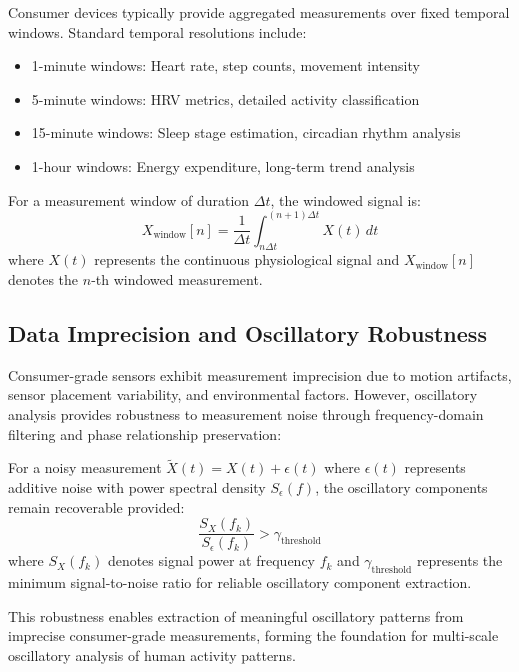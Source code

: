 Consumer devices typically provide aggregated measurements over fixed temporal windows. Standard temporal resolutions include:

\begin{itemize}
\item 1-minute windows: Heart rate, step counts, movement intensity
\item 5-minute windows: HRV metrics, detailed activity classification
\item 15-minute windows: Sleep stage estimation, circadian rhythm analysis
\item 1-hour windows: Energy expenditure, long-term trend analysis
\end{itemize}

\begin{definition}
For a measurement window of duration $\Delta t$, the windowed signal is:
\begin{equation}
X_{\text{window}}[n] = \frac{1}{\Delta t} \int_{n\Delta t}^{(n+1)\Delta t} X(t) \, dt
\end{equation}
where $X(t)$ represents the continuous physiological signal and $X_{\text{window}}[n]$ denotes the $n$-th windowed measurement.
\end{definition}

\subsection{Data Imprecision and Oscillatory Robustness}

Consumer-grade sensors exhibit measurement imprecision due to motion artifacts, sensor placement variability, and environmental factors. However, oscillatory analysis provides robustness to measurement noise through frequency-domain filtering and phase relationship preservation:

\begin{theorem}
For a noisy measurement $\tilde{X}(t) = X(t) + \epsilon(t)$ where $\epsilon(t)$ represents additive noise with power spectral density $S_\epsilon(f)$, the oscillatory components remain recoverable provided:
\begin{equation}
\frac{S_X(f_k)}{S_\epsilon(f_k)} > \gamma_{\text{threshold}}
\end{equation}
where $S_X(f_k)$ denotes signal power at frequency $f_k$ and $\gamma_{\text{threshold}}$ represents the minimum signal-to-noise ratio for reliable oscillatory component extraction.
\end{theorem}

This robustness enables extraction of meaningful oscillatory patterns from imprecise consumer-grade measurements, forming the foundation for multi-scale oscillatory analysis of human activity patterns.

